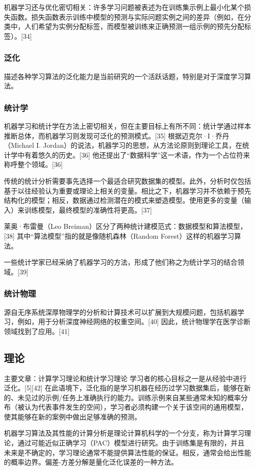 机器学习还与优化密切相关：许多学习问题被表述为在训练集示例上最小化某个损失函数。损失函数表示训练中模型的预测与实际问题实例之间的差异（例如，在分类中，人们希望为实例分配标签，而模型被训练来正确预测一组示例的预先分配标签）。[34]
\subsubsection{泛化}  
描述各种学习算法的泛化能力是当前研究的一个活跃话题，特别是对于深度学习算法。
\subsubsection{统计学}  
机器学习和统计学在方法上密切相关，但在主要目标上有所不同：统计学通过样本推断总体，而机器学习则发现可泛化的预测模式。[35] 根据迈克尔·I·乔丹（Michael I. Jordan）的说法，机器学习的思想，从方法论原则到理论工具，在统计学中有着悠久的历史。[36] 他还提出了“数据科学”这一术语，作为一个占位符来称呼整个领域。[36]

传统的统计分析需要事先选择一个最适合研究数据集的模型。此外，分析时仅包括基于以往经验认为重要或理论上相关的变量。相比之下，机器学习并不依赖于预先结构化的模型；相反，数据通过检测潜在的模式来塑造模型。使用更多的变量（输入）来训练模型，最终模型的准确性将更高。[37]

莱奥·布雷曼（Leo Breiman）区分了两种统计建模范式：数据模型和算法模型，[38] 其中“算法模型”指的就是像随机森林（Random Forest）这样的机器学习算法。

一些统计学家已经采纳了机器学习的方法，形成了他们称之为统计学习的结合领域。[39]
\subsubsection{统计物理}  
源自无序系统深厚物理学的分析和计算技术可以扩展到大规模问题，包括机器学习，例如，用于分析深度神经网络的权重空间。[40] 因此，统计物理学在医学诊断领域找到了应用。[41]
\subsection{理论}  
主要文章：计算学习理论和统计学习理论  
学习者的核心目标之一是从经验中进行泛化。[5][42] 在此语境下，泛化指的是学习机器在经历过学习数据集后，能够在新的、未见过的示例/任务上准确执行的能力。训练示例来自某些通常未知的概率分布（被认为代表事件发生的空间），学习者必须构建一个关于该空间的通用模型，使其能够在新的案例中做出足够准确的预测。

机器学习算法及其性能的计算分析是理论计算机科学的一个分支，称为计算学习理论，通过可能近似正确学习（PAC）模型进行研究。由于训练集是有限的，并且未来是不确定的，学习理论通常不能提供算法性能的保证。相反，通常会给出性能的概率边界。偏差-方差分解是量化泛化误差的一种方法。

